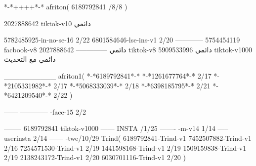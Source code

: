 *-*++++*-*
afriton(
6189792841 /8/8
)

2027888642 tiktok-v10
دائمي

5782485925-in-no-se-16 2/22
6801584646-lse-ins-v1 2/20
------------
5754454119 facbook-v8
دائمي
--------------
2027888642 tiktok-v8
دائمي
5909533996 tiktok-v1000
دائمي مع التحديث

__________
afriton1(
*-*6189792841*-*
*-*1261677764*-* 2/17
*-*2105331982*-* 2/17
*-*5068333039*-* 2/18
*-*6398185795*-* 2/21
*-*6421209540*-* 2/22
)

------
------------
-face-15 2/2

--------
6189792841 tiktok-v1000
------
 INSTA /1/25
-------
-m-v14 1/14
-----
userinsta 2/14
------
-twe/10/29
Trind(
6189792841-Trind-v1 
7452507882-Trind-v1 2/16
7254571530-Trind-v1 2/19
1441598168-Trind-v1 2/19
1509159838-Trind-v1 2/19
2138243172-Trind-v1 2/20
6030701116-Trind-v1 2/20
)
